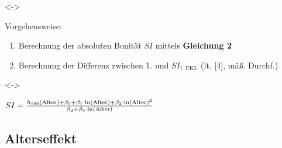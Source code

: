 \begin{frame}[c]
  \visible<\theFirstElement->{Vorgehensweise:
  \begin{enumerate}
  \item Berechnung der absoluten Bonität \(SI\) mittels \textbf{Gleichung 2}
  \item Berechnung der Differenz zwischen 1. und \(SI_{\text{I. EKL}}\) (lt. [4], mäß. Durchf.)
  \end{enumerate}}

  \visible<\theFirstElement->{\begin{center}
      \begin{minipage}{0.5\linewidth}
        \centerline{\(SI = \frac{h_{100}(\text{Alter}) + \beta_0 + \beta_1 \cdot \ln(\text{Alter}) + \beta_2 \cdot \ln(\text{Alter})^2 }{\beta_3 + \beta_4 \cdot \ln(\text{Alter})}{}\)}
        \vspace{\captiondistance}
      \end{minipage}
    \end{center}}

\end{frame}

\subsection{Alterseffekt}

